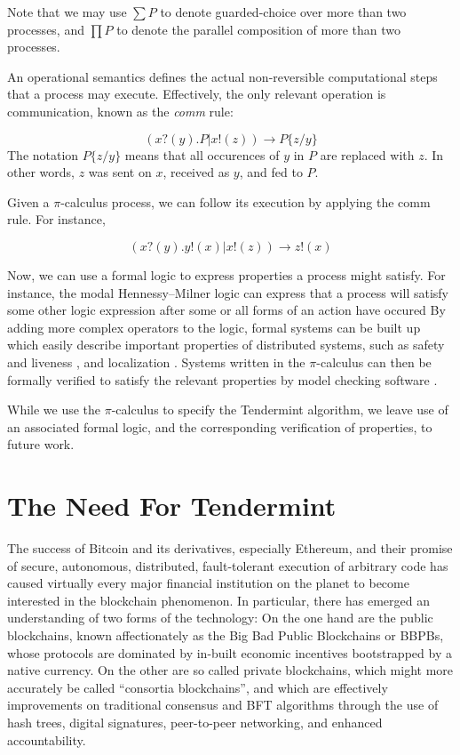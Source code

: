 Note that we may use $\sum P$ to denote guarded-choice over more than two processes,
and $\prod P$ to denote the parallel composition of more than two processes.

An operational semantics defines the actual non-reversible computational steps that a process may execute.
Effectively, the only relevant operation is communication, known as the \emph{comm} rule:

\begin{equation}
( x?(y).P | x!(z) )  \rightarrow P\{z/y\}
\end{equation} 
The notation $P\{z/y\}$ means that all occurences of $y$ in $P$ are replaced with $z$.
In other words, $z$ was sent on $x$, received as $y$, and fed to $P$.

Given a $\pi$-calculus process, we can follow its execution by applying the comm rule.
For instance, 

\begin{equation}
( x?(y).y!(x) | x!(z) )  \rightarrow z!(x)
\end{equation} 

Now, we can use a formal logic to express properties a process might satisfy.
For instance, the modal Hennessy–Milner logic can express that a process
will satisfy some other logic expression after some or all forms of an action have occured \cite{milner1993modal}
By adding more complex operators to the logic, 
formal systems can be built up which easily describe important properties of distributed systems,
such as safety and liveness \cite{stirling1991local}, and localization \cite{caires2003spatial}.
Systems written in the $\pi$-calculus can then be formally verified to satisfy 
the relevant properties by model checking software \cite{vieira2004spatial}.

While we use the $\pi$-calculus to specify the Tendermint algorithm, 
we leave use of an associated formal logic, 
and the corresponding verification of properties, to future work.

\section{The Need For Tendermint}

The success of Bitcoin and its derivatives, especially Ethereum, and their promise of secure, autonomous, distributed, fault-tolerant execution of arbitrary code has caused virtually every major financial institution on the planet to become interested in the blockchain phenomenon. 
In particular, there has emerged an understanding of two forms of the technology:
On the one hand are the public blockchains, known affectionately as the Big Bad Public Blockchains or BBPBs, 
whose protocols are dominated by in-built economic incentives bootstrapped by a native currency.
On the other are so called private blockchains, which might more accurately be called ``consortia blockchains'',
and which are effectively improvements on traditional consensus and BFT algorithms through the use of hash trees, digital signatures, 
peer-to-peer networking, and enhanced accountability.

